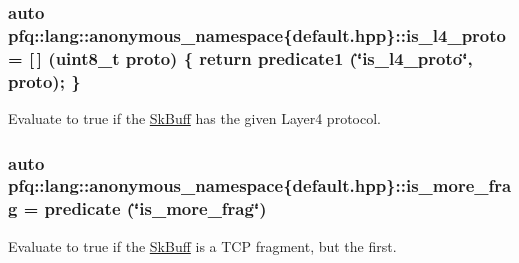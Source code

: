 \hypertarget{namespacepfq_1_1lang_1_1anonymous__namespace_02default_8hpp_03_a9d06d4dedca1ebdc3b270cb2f3e9e42b}{
\subsubsection[{is\+\_\+l4\+\_\+proto}]{\setlength{\rightskip}{0pt plus 5cm}auto pfq\+::lang\+::anonymous\+\_\+namespace\{default.\+hpp\}\+::is\+\_\+l4\+\_\+proto = \mbox{[}$\,$\mbox{]} (uint8\+\_\+t proto) \{ return {\bf predicate1} (\char`\"{}is\+\_\+l4\+\_\+proto\char`\"{}, proto); \}}}\label{namespacepfq_1_1lang_1_1anonymous__namespace_02default_8hpp_03_a9d06d4dedca1ebdc3b270cb2f3e9e42b}


Evaluate to {\ttfamily true} if the \hyperlink{structpfq_1_1lang_1_1SkBuff}{Sk\+Buff} has the given Layer4 protocol. 

\hypertarget{namespacepfq_1_1lang_1_1anonymous__namespace_02default_8hpp_03_a0b169afb2f21c8626f06f77ca75feded}{
\subsubsection[{is\+\_\+more\+\_\+frag}]{\setlength{\rightskip}{0pt plus 5cm}auto pfq\+::lang\+::anonymous\+\_\+namespace\{default.\+hpp\}\+::is\+\_\+more\+\_\+frag = {\bf predicate} (\char`\"{}is\+\_\+more\+\_\+frag\char`\"{})}}\label{namespacepfq_1_1lang_1_1anonymous__namespace_02default_8hpp_03_a0b169afb2f21c8626f06f77ca75feded}


Evaluate to {\ttfamily true} if the \hyperlink{structpfq_1_1lang_1_1SkBuff}{Sk\+Buff} is a T\+C\+P fragment, but the first. 

